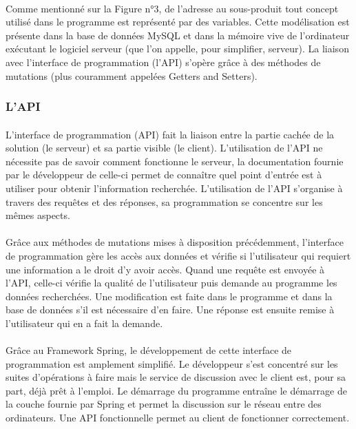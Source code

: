 \documentclass[a4paper, 12pt]{article}
\begin{document}
\paragraph{}Comme mentionné sur la Figure n°3, de l’adresse au sous-produit tout concept utilisé dans le programme est représenté par des variables.  Cette modélisation est présente dans la base de données MySQL et dans la mémoire vive de l’ordinateur exécutant le logiciel serveur (que l’on appelle, pour simplifier, serveur). La liaison avec l’interface de programmation (l’API) s’opère grâce à des méthodes de mutations (plus couramment appelées Getters and Setters).

\subsubsection{L'API}

\paragraph{}L’interface de programmation (API) fait la liaison entre la partie cachée de la solution (le serveur) et sa partie visible (le client). L’utilisation de l’API ne nécessite pas de savoir comment fonctionne le serveur, la documentation fournie par le développeur de celle-ci permet de connaître quel point d’entrée est à utiliser pour obtenir l’information recherchée. L’utilisation de l’API s’organise à travers des requêtes et des réponses, sa programmation se concentre sur les mêmes aspects.
\paragraph{}Grâce aux méthodes de mutations mises à disposition précédemment, l’interface de programmation gère les accès aux données et vérifie si l’utilisateur qui requiert une information a le droit d’y avoir accès. Quand une requête est envoyée à l’API, celle-ci vérifie la qualité de l’utilisateur puis demande au programme les données recherchées. Une modification est faite dans le programme et dans la base de données s’il est nécessaire d’en faire. Une réponse est ensuite remise à l’utilisateur qui en a fait la demande.
\paragraph{}Grâce au Framework Spring, le développement de cette interface de programmation est amplement simplifié. Le développeur s’est concentré sur les suites d’opérations à faire mais le service de discussion avec le client est, pour sa part, déjà prêt à l’emploi. Le démarrage du programme entraîne le démarrage de la couche fournie par Spring et permet la discussion sur le réseau entre des ordinateurs.
\noindent Une API fonctionnelle permet au client de fonctionner correctement.
\end{document}
